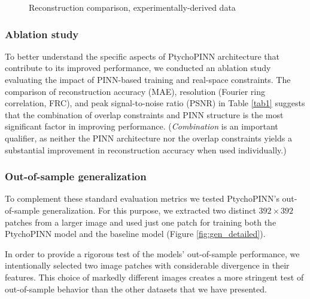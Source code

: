 \documentclass[sn-mathphys]{sn-jnl}%
\theoremstyle{thmstyleone}%
\theoremstyle{thmstyletwo}%
\theoremstyle{thmstylethree}%
\begin{document}
\begin{figure}%
    \centering
\vfill
    \caption{Reconstruction comparison, experimentally-derived data}%
    \label{fig:exp_comparison_detailed}%
\end{figure}

\subsubsection{Ablation study}

To better understand the specific aspects of PtychoPINN architecture that contribute to its improved performance, we conducted an ablation study evaluating the impact of PINN-based training and real-space constraints. The comparison of reconstruction accuracy (MAE), resolution (Fourier ring correlation, FRC), and peak signal-to-noise ratio (PSNR) in Table \ref{tab1} suggests that the combination of overlap constraints and PINN structure is the most significant factor in improving performance. (\emph{Combination} is an important qualifier, as neither the PINN architecture nor the overlap constraints yields a substantial improvement in reconstruction accuracy when used individually.)

\subsubsection{Out-of-sample generalization}
To complement these standard evaluation metrics we tested PtychoPINN's out-of-sample generalization. For this purpose, we extracted two distinct $392 \times 392$ patches from a larger image and used just one patch for training both the PtychoPINN model and the baseline model (Figure \ref{fig:gen_detailed}).

In order to provide a rigorous test of the models' out-of-sample performance, we intentionally selected two image patches with considerable divergence in their features. This choice of markedly different images creates a more stringent test of out-of-sample behavior than the other datasets that we have presented.
\end{document}
